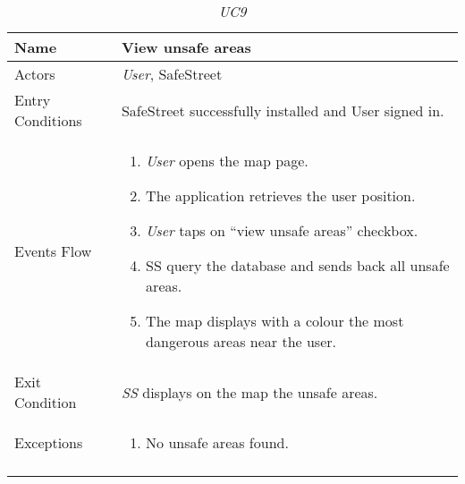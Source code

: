 \documentclass[../../../RASD.tex]{subfiles}
\begin{document}
    \begin{center}
        \begin{longtable}{| p{.35\linewidth} | p{.65\linewidth} |}
            \hline
            \textbf{Name} & \textbf{View unsafe areas}\\ \hline
            Actors & \textit{User}, SafeStreet\\ \hline
            Entry Conditions & SafeStreet successfully installed and User signed in.\\ \hline
            Events Flow &
            \begin{enumerate}
                \item \textit{User} opens the map page.
                \item  The application retrieves the user position.
                \item \textit{User} taps on “view unsafe areas” checkbox.
                \item  SS query the database and sends back all unsafe areas.
                \item The map displays with a colour the most dangerous areas near the user.
            \end{enumerate}
            \\ \hline
            Exit Condition & \textit{SS} displays on the map the unsafe areas.\\ \hline
            Exceptions &
            \begin{enumerate}
                \item No unsafe areas found.
            \end{enumerate}
            \\
            \hline
            \caption[\textit{Use Case 9}]{\textit{UC9}}
        \end{longtable}
    \end{center}
    \newpage
\end{document}
